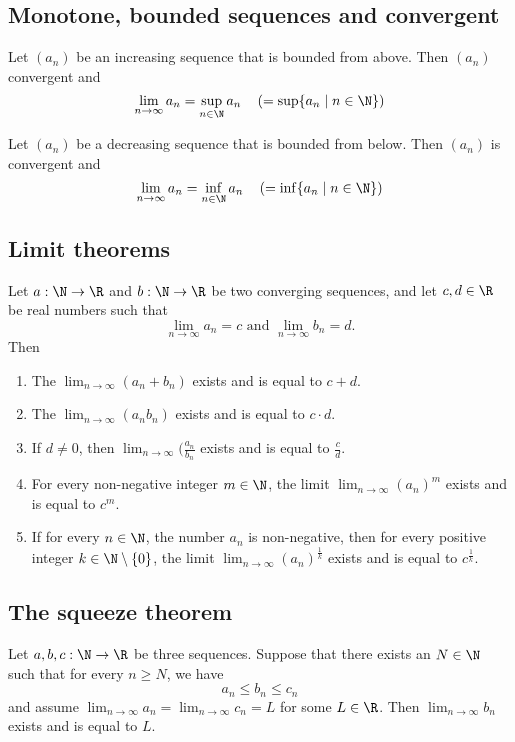 \subsection{Monotone, bounded sequences and convergent}
\begin{theorem}
    Let $(a_n)$ be an increasing sequence that is bounded from above. Then $(a_n)$ convergent and
    $$\lim_{n\to\infty}a_n = \sup_{n\in\N}a_n \quad \left( = \sup \{a_n \mid n\in\N\}\right)$$
\end{theorem}

\begin{theorem}
    Let $(a_n)$ be a decreasing sequence that is bounded from below. Then $(a_n)$ is convergent and
    $$\lim_{n\to\infty}a_n = \inf_{n\in\N}a_n \quad \left( = \inf \{a_n \mid n\in\N\}\right)$$
\end{theorem}

\subsection{Limit theorems}
\begin{theorem}
    Let $a: \N \to \R$ and $b: \N \to \R$ be two converging sequences, and let $c,d \in \R$ be real numbers such that
    $$\lim_{n\to\infty}a_n = c \text{ and } \lim_{n\to\infty}b_n = d.$$
    Then
    \begin{enumerate}
        \item The $\lim_{n\to\infty}(a_n + b_n)$ exists and is equal to $c + d$.
        \item The $\lim_{n\to\infty}(a_nb_n)$ exists and is equal to $c \cdot d$.
        \item If $d \ne 0$, then $\lim_{n\to\infty}(\frac{a_n}{b_n}$ exists and is equal to $\frac{c}{d}$.
        \item For every non-negative integer $m \in \N$, the  limit $\lim_{n\to\infty}(a_n)^m$ exists and is equal to $c^m$.
        \item If for every $n \in \N$, the number $a_n$ is non-negative, then for every positive integer $k \in \N \setminus \{0\}$, the limit $\lim_{n\to\infty}(a_n)^{\frac{1}{k}}$ exists and is equal to $c^{\frac{1}{k}}$.
    \end{enumerate}
\end{theorem}

\subsection{The squeeze theorem}
\begin{theorem}
    Let $a,b,c : \N \to \R$ be three sequences. Suppose that there exists an $N \in \N$ such that for every $n \ge N$, we have
    $$a_n \le b_n \le c_n$$
    and assume $\lim_{n\to\infty}a_n = \lim_{n\to\infty}c_n = L$ for some $L \in \R$. Then $\lim_{n\to\infty}b_n$ exists and is equal to $L$.
\end{theorem}

